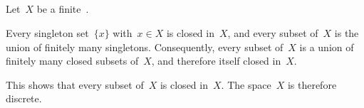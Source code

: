 \subsection{}

Let~$X$ be a finite~.

Every singleton set~$\{ x \}$ with~$x ∈ X$ is closed in~$X$, and every subset of~$X$ is the union of finitely many singletons.
Consequently, every subset of~$X$ is a union of finitely many closed subsets of~$X$, and therefore itself closed in~$X$.

This shows that every subset of~$X$ is closed in~$X$.
The space~$X$ is therefore discrete.
